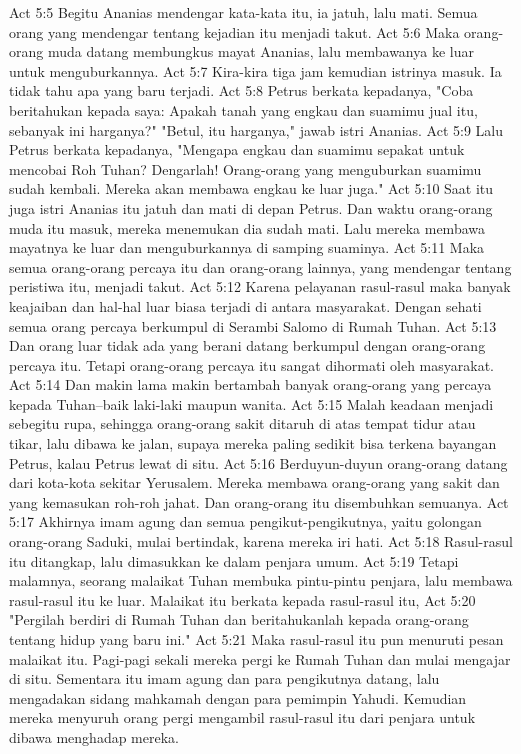 Act 5:5  Begitu Ananias mendengar kata-kata itu, ia jatuh, lalu mati. Semua orang yang mendengar tentang kejadian itu menjadi takut.
Act 5:6  Maka orang-orang muda datang membungkus mayat Ananias, lalu membawanya ke luar untuk menguburkannya.
Act 5:7  Kira-kira tiga jam kemudian istrinya masuk. Ia tidak tahu apa yang baru terjadi.
Act 5:8  Petrus berkata kepadanya, "Coba beritahukan kepada saya: Apakah tanah yang engkau dan suamimu jual itu, sebanyak ini harganya?" "Betul, itu harganya," jawab istri Ananias.
Act 5:9  Lalu Petrus berkata kepadanya, "Mengapa engkau dan suamimu sepakat untuk mencobai Roh Tuhan? Dengarlah! Orang-orang yang menguburkan suamimu sudah kembali. Mereka akan membawa engkau ke luar juga."
Act 5:10  Saat itu juga istri Ananias itu jatuh dan mati di depan Petrus. Dan waktu orang-orang muda itu masuk, mereka menemukan dia sudah mati. Lalu mereka membawa mayatnya ke luar dan menguburkannya di samping suaminya.
Act 5:11  Maka semua orang-orang percaya itu dan orang-orang lainnya, yang mendengar tentang peristiwa itu, menjadi takut.
Act 5:12  Karena pelayanan rasul-rasul maka banyak keajaiban dan hal-hal luar biasa terjadi di antara masyarakat. Dengan sehati semua orang percaya berkumpul di Serambi Salomo di Rumah Tuhan.
Act 5:13  Dan orang luar tidak ada yang berani datang berkumpul dengan orang-orang percaya itu. Tetapi orang-orang percaya itu sangat dihormati oleh masyarakat.
Act 5:14  Dan makin lama makin bertambah banyak orang-orang yang percaya kepada Tuhan--baik laki-laki maupun wanita.
Act 5:15  Malah keadaan menjadi sebegitu rupa, sehingga orang-orang sakit ditaruh di atas tempat tidur atau tikar, lalu dibawa ke jalan, supaya mereka paling sedikit bisa terkena bayangan Petrus, kalau Petrus lewat di situ.
Act 5:16  Berduyun-duyun orang-orang datang dari kota-kota sekitar Yerusalem. Mereka membawa orang-orang yang sakit dan yang kemasukan roh-roh jahat. Dan orang-orang itu disembuhkan semuanya.
Act 5:17  Akhirnya imam agung dan semua pengikut-pengikutnya, yaitu golongan orang-orang Saduki, mulai bertindak, karena mereka iri hati.
Act 5:18  Rasul-rasul itu ditangkap, lalu dimasukkan ke dalam penjara umum.
Act 5:19  Tetapi malamnya, seorang malaikat Tuhan membuka pintu-pintu penjara, lalu membawa rasul-rasul itu ke luar. Malaikat itu berkata kepada rasul-rasul itu,
Act 5:20  "Pergilah berdiri di Rumah Tuhan dan beritahukanlah kepada orang-orang tentang hidup yang baru ini."
Act 5:21  Maka rasul-rasul itu pun menuruti pesan malaikat itu. Pagi-pagi sekali mereka pergi ke Rumah Tuhan dan mulai mengajar di situ. Sementara itu imam agung dan para pengikutnya datang, lalu mengadakan sidang mahkamah dengan para pemimpin Yahudi. Kemudian mereka menyuruh orang pergi mengambil rasul-rasul itu dari penjara untuk dibawa menghadap mereka.
